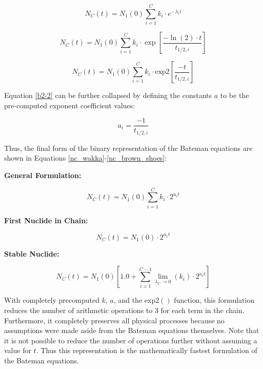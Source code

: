 \documentclass{anstrans}
\begin{document}
\begin{equation}
\label{b2-0}
N_C(t) = N_1(0) \sum_{i=1}^C k_{i} \cdot e^{-\lambda_i t}
\end{equation}

\begin{equation}
\label{b2-1}
N_C(t) = N_1(0) \sum_{i=1}^C k_{i} \cdot \exp\left[\frac{-\ln(2)\cdot t}{t_{1/2,i}}\right]
\end{equation}

\begin{equation}
\label{b2-2}
N_C(t) = N_1(0) \sum_{i=1}^C k_{i} \cdot \mathrm{exp2}\left[\frac{-t}{t_{1/2,i}}\right]
\end{equation}

Equation \ref{b2-2} can be further collapsed by defining the constants $a$ to 
be the pre-computed exponent coefficient values:

\begin{equation}
\label{a_i}
a_i = \frac{-1}{t_{1/2,i}}
\end{equation}

Thus, the final form of the binary representation of the Bateman equations 
are shown in Equations \ref{nc_wakka}-\ref{nc_brown_shoes}:

\textbf{General Formulation:}

\begin{equation}
\label{nc_wakka}
N_C(t) = N_1(0) \sum_{i=1}^C k_{i} \cdot 2^{a_i t}
\end{equation}

\textbf{First Nuclide in Chain:}

\begin{equation}
\label{nc_jawakka}
N_C(t) = N_1(0) \cdot 2^{a_1 t}
\end{equation}

\textbf{Stable Nuclide:}

\begin{equation}
\label{nc_brown_shoes}
N_C(t) = N_1(0) \left[1.0 + \sum_{i=1}^{C-1} \lim_{\lambda_C\to 0}(k_{i}) \cdot 2^{a_i t} \right]
\end{equation}

With completely precomputed $k$, $a$, and the $\mathrm{exp2}()$ function, this 
formulation reduces the number of arithmetic operations to 3 for each term 
in the chain. Furthermore, it completely preserves all physical processes 
because no assumptions were made aside from the Bateman equations themselves.
Note that it is not possible to reduce the number of operations further
without assuming a value for $t$. Thus this representation is the 
mathematically fastest formulation of the Bateman equations.
\end{document}
